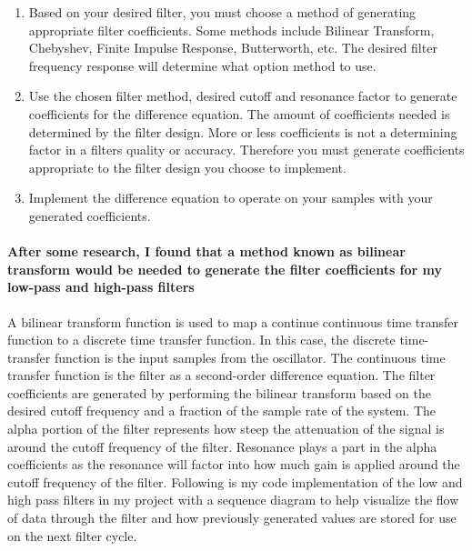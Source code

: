 \documentclass[acmlarge,screen]{acmart}
\begin{document}
	\begin{enumerate}
		\item Based on your desired filter, you must choose a method of generating appropriate filter coefficients. Some methods include Bilinear Transform, Chebyshev, Finite Impulse Response, Butterworth, etc. The desired filter frequency response will determine what option method to use.
		\item Use the chosen filter method, desired cutoff and resonance factor to generate coefficients for the difference equation. The amount of coefficients needed is determined by the filter design. More or less coefficients is not a determining factor in a filters quality or accuracy. Therefore you must generate coefficients appropriate to the filter design you choose to implement.
		\item Implement the difference equation to operate on your samples with your generated coefficients.
	\end{enumerate}

	\paragraph{After some research, I found that a method known as bilinear transform would be needed to generate the filter coefficients for my low-pass and high-pass filters} A bilinear transform function is used to map a continue continuous time transfer function to a discrete time transfer function. In this case, the discrete time-transfer function is the input samples from the oscillator. The continuous time transfer function is the filter as a second-order difference equation. The filter coefficients are generated by performing the bilinear transform based on the desired cutoff frequency and a fraction of the sample rate of the system.\cite{stanford_2007} The alpha portion of the filter represents how steep the attenuation of the signal is around the cutoff frequency of the filter. Resonance plays a part in the alpha coefficients as the resonance will factor into how much gain is applied around the cutoff frequency of the filter. Following is my code implementation of the low and high pass filters in my project with a sequence diagram to help visualize the flow of data through the filter and how previously generated values are stored for use on the next filter cycle.

	\clearpage
\end{document}
